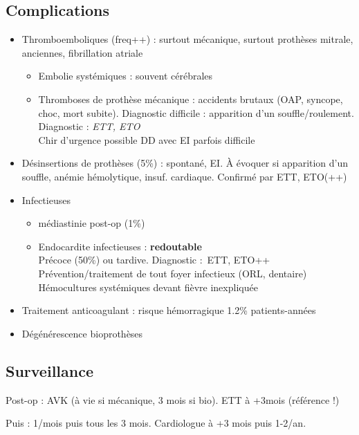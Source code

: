 \documentclass{article}
\begin{document}
\subsection{Complications}
\begin{itemize}
  \item Thromboemboliques (freq++) : surtout mécanique, surtout prothèses mitrale,
    anciennes, fibrillation atriale
    \begin{itemize}
      \item Embolie systémiques : souvent cérébrales
      \item Thromboses de prothèse mécanique : accidents brutaux (OAP, syncope,
        choc, mort subite). Diagnostic difficile : apparition d'un
        souffle/roulement. Diagnostic : \textit{ETT, ETO} \\
        Chir d'urgence possible
        \danger DD avec EI parfois difficile
    \end{itemize}
  \item Désinsertions de prothèses (5\%) : spontané, EI. À évoquer si apparition d'un
    souffle, anémie hémolytique, insuf. cardiaque. Confirmé par ETT, ETO(++)

  \item Infectieuses
    \begin{itemize}
      \item médiastinie post-op (1\%)
      \item Endocardite infectieuses : \textbf{redoutable} \skull\\
        Précoce (50\%) ou tardive. Diagnostic : ETT, ETO++\\
        Prévention/traitement de tout foyer infectieux (ORL, dentaire)\\
        Hémocultures systémiques devant fièvre inexpliquée
    \end{itemize}
  \item Traitement anticoagulant : risque hémorragique 1.2\% patients-années
  \item Dégénérescence bioprothèses
\end{itemize}

\subsection{Surveillance}
Post-op : AVK (à vie si mécanique, 3 mois si bio). ETT à +3mois (référence !)

Puis : 1/mois puis tous les 3 mois. Cardiologue à +3 mois puis 1-2/an.
\end{document}
